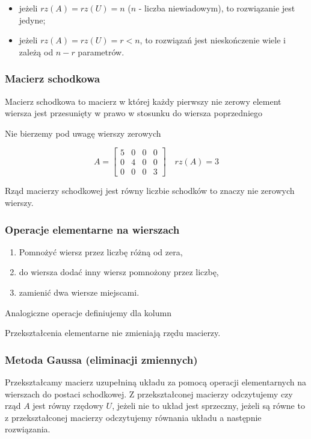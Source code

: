 \documentclass[../Matematyka.tex]{subfiles}
\begin{document}
    \begin{itemize}
        \item jeżeli \(rz(A) = rz(U) = n\) (\(n\) - liczba niewiadowym), to rozwiązanie jest jedyne;
        \item jeżeli \(rz(A) = rz(U) = r < n\), to rozwiązań jest nieskończenie wiele i zależą od \(n - r\) parametrów.
    \end{itemize}

    \subsubsection{Macierz schodkowa}
    Macierz schodkowa to macierz w której każdy pierwszy nie zerowy element wiersza jest przesunięty w prawo w stosunku do wiersza poprzedniego

    Nie bierzemy pod uwagę wierszy zerowych

    \begin{displaymath}
        A =
        \begin{bmatrix}
            5 & 0 & 0 & 0 \\
            0 & 4 & 0 & 0 \\
            0 & 0 & 0 & 3
        \end{bmatrix}
        \quad
        rz(A) = 3
    \end{displaymath}

    Rząd macierzy schodkowej jest równy liczbie schodków to znaczy nie zerowych wierszy.

    \subsubsection{Operacje elementarne na wierszach}
    \begin{enumerate}
        \item Pomnożyć wiersz przez liczbę różną od zera,
        \item do wiersza dodać inny wiersz pomnożony przez liczbę,
        \item zamienić dwa wiersze miejscami.
    \end{enumerate}

    Analogiczne operacje definiujemy dla kolumn

    Przekształcenia elementarne nie zmieniają rzędu macierzy.

    \subsubsection{Metoda Gaussa (eliminacji zmiennych)}
    Przekształcamy macierz uzupełniną układu za pomocą operacji elementarnych na wierszach do postaci schodkowej. 
    Z przekształconej macierzy odczytujemy czy rząd \(A\) jest równy rzędowy \(U\), jeżeli nie to układ jest sprzeczny, 
    jeżeli są równe to z przekształconej macierzy odczytujemy równania układu a następnie rozwiązania. 
\end{document}
